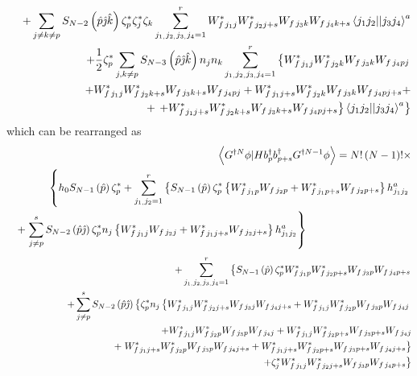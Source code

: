\documentclass{article}
\begin{document}
\begin{eqnarray}
&&+\sum_{j\neq k\neq p}S_{N-2}\left( \hat{p}\hat{\jmath}\hat{k}\right) \zeta
_{p}^{\ast }\zeta _{j}^{\ast }\zeta
_{k}\sum_{j_{1,}j_{2,}j_{3,}j_{4}=1}^{r}W_{f\,j_{1}j}^{\ast
}W_{f\,j_{2}j+s}^{\ast }W_{f\,j_{3}k}W_{f\,j_{4}k+s}\left\langle
j_{1}j_{2}||j_{3}j_{4}\right\rangle ^{a}  \notag \\
&&+\frac{1}{2}\zeta _{p}^{\ast }\sum_{j,k\neq p}S_{N-3}\left( \hat{p}\hat{%
\jmath}\hat{k}\right) n_{j}n_{k}\sum_{j_{1,}j_{2,}j_{3,}j_{4}=1}^{r}\left\{
W_{f\,j_{1}j}^{\ast }W_{f\,j_{2}k}^{\ast }W_{f\,j_{3}k}W_{f\,j_{4}pj}\right.
\notag \\
&&\qquad \qquad \qquad +W_{f\,j_{1}j}^{\ast }W_{f\,j_{2}k+s}^{\ast
}W_{f\,j_{3}k+s}W_{f\,j_{4}pj}+W_{f\,j_{1}j+s}^{\ast }W_{f\,j_{2}k}^{\ast
}W_{f\,j_{3}k}W_{f\,j_{4}pj+s}+  \notag \\
&&\qquad \qquad \qquad \qquad \qquad \quad +\left. \left.
+W_{f\,j_{1}j+s}^{\ast }W_{f\,j_{2}k+s}^{\ast
}W_{f\,j_{3}k+s}W_{f\,j_{4}pj+s}\right\} \left\langle
j_{1}j_{2}||j_{3}j_{4}\right\rangle ^{a}\right\}
\end{eqnarray}%
which can be rearranged as%
\begin{eqnarray}
&&\left\langle G^{\dagger N}\phi |Hb_{p}^{\dagger }b_{p+s}^{\dagger
}G^{\dagger N-1}\phi \right\rangle =N!\left( N-1\right) !\times  \notag \\
&&\left\{ h_{0}S_{N-1}\left( \hat{p}\right) \zeta _{p}^{\ast
}+\sum_{j_{1,}j_{2}=1}^{r}\left\{ S_{N-1}\left( \hat{p}\right) \zeta
_{p}^{\ast }\left\{ W_{f\,j_{1}p}^{\ast }W_{f\,j_{2}p}+W_{f\,j_{1}p+s}^{\ast
}W_{f\,j_{2}p+s}\right\} h_{j_{1}j_{2}}^{a}\right. \right.  \notag \\
&&+\left. \sum_{j\neq p}^{s}S_{N-2}\left( \hat{p}\hat{\jmath}\right) \zeta
_{p}^{\ast }n_{j}\left\{ W_{f\,j_{1}j}^{\ast
}W_{f\,j_{2}j}+W_{f\,j_{1}j+s}^{\ast }W_{f\,j_{2}j+s}\right\}
h_{j_{1}j_{2}}^{a}\right\} \qquad \qquad \qquad \qquad \qquad
\end{eqnarray}%
\begin{eqnarray}
&&+\sum_{j_{1,}j_{2,}j_{3,}j_{4}=1}^{r}\left\{ S_{N-1}\left( \hat{p}\right)
\zeta _{p}^{\ast }W_{f\,j_{1}p}^{\ast }W_{f\,j_{2}p+s}^{\ast
}W_{f\,j_{3}p}W_{f\,j_{4}p+s}\right.  \notag \\
&&+\sum_{j\neq p}^{s}S_{N-2}\left( \hat{p}\hat{\jmath}\right) \left\{ \zeta
_{p}^{\ast }n_{j}\left\{ W_{f\,j_{1}j}^{\ast }W_{f\,j_{2}j+s}^{\ast
}W_{f\,j_{3}j}W_{f\,j_{4}j+s}+W_{f\,j_{1}j}^{\ast }W_{f\,j_{2}p}^{\ast
}W_{f\,j_{3}p}W_{f\,j_{4}j}\right. \right.  \notag \\
&&\qquad \qquad \qquad \qquad \qquad +W_{f\,j_{1}j}^{\ast
}W_{f\,j_{2}p}^{\ast }W_{f\,j_{3}p}W_{f\,j_{4}j}+W_{f\,j_{1}j}^{\ast
}W_{f\,j_{2}p+s}^{\ast }W_{f\,j_{3}p+s}W_{f\,j_{4}j}  \notag \\
&&\qquad \qquad \qquad \qquad \qquad +\left. W_{f\,j_{1}j+s}^{\ast
}W_{f\,j_{2}p}^{\ast }W_{f\,j_{3}p}W_{f\,j_{4}j+s}+W_{f\,j_{1}j+s}^{\ast
}W_{f\,j_{2}p+s}^{\ast }W_{f\,j_{3}p+s}W_{f\,j_{4}j+s}\right\}  \notag \\
&&\qquad \qquad \qquad \qquad \qquad \qquad \qquad \qquad \qquad \left.
+\zeta _{j}^{\ast }W_{f\,j_{1}j}^{\ast }W_{f\,j_{2}j+s}^{\ast
}W_{f\,j_{3}p}W_{f\,j_{4}p+s}\right\}
\end{eqnarray}%
\end{document}
